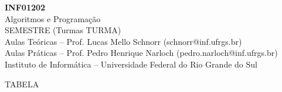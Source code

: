 \documentclass[11pt,portuguese,]{article}
\begin{document}
\clearpage\thispagestyle{empty}

\begin{center}
  {\LARGE     {\bf INF01202} \\
    Algoritmos e Programação \\
    SEMESTRE (Turmas TURMA)} \\
  Aulas Teóricas -- Prof. Lucas Mello Schnorr (schnorr@inf.ufrgs.br) \\
  Aulas Práticas -- Prof. Pedro Henrique Narloch (pedro.narloch@inf.ufrgs.br) \\
  Instituto de Informática -- Universidade Federal do Rio Grande do Sul
\end{center}

TABELA
\end{document}
